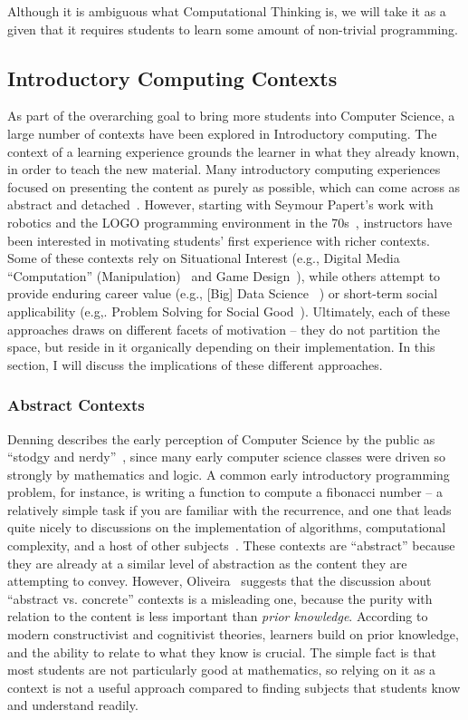 Although it is ambiguous what Computational Thinking is, we will take it as a given that it requires students to learn some amount of non-trivial programming.

\subsection{Introductory Computing Contexts}

As part of the overarching goal to bring more students into Computer Science, a large number of contexts have been explored in Introductory computing. 
The context of a learning experience grounds the learner in what they already known, in order to teach the new material.
Many introductory computing experiences focused on presenting the content as purely as possible, which can come across as abstract and detached~\cite{Zografski}.
However, starting with Seymour Papert's work with robotics and the LOGO programming environment in the 70s~\cite{papert1996}, instructors have been interested in motivating students' first experience with richer contexts.
Some of these contexts rely on Situational Interest (e.g.,  Digital Media ``Computation'' (Manipulation)~\cite{Forte} and Game Design~\cite{Zografski}), while others attempt to provide enduring career value (e.g., [Big] Data Science ~\cite{Anderson}) or short-term social applicability (e.g,. Problem Solving for Social Good~\cite{SocialGoodinComputingEducation}).
Ultimately, each of these approaches draws on different facets of motivation -- they do not partition the space, but reside in it organically depending on their implementation.
In this section, I will discuss the implications of these different approaches.


\subsubsection{Abstract Contexts}

Denning describes the early perception of Computer Science by the public as ``stodgy and nerdy''~\cite{Denning:2005}, since many early computer science classes were driven so strongly by mathematics and logic.
A common early introductory programming problem, for instance, is writing a function to compute a fibonacci number -- a relatively simple task if you are familiar with the recurrence, and one that leads quite nicely to discussions on the implementation of algorithms, computational complexity, and a host of other subjects~\cite{crazypantsfibonaccipaper}.
These contexts are ``abstract'' because they are already at a similar level of abstraction as the content they are attempting to convey.
However, Oliveira~\cite{ConcreteVsAbstract} suggests that the discussion about ``abstract vs. concrete'' contexts is a misleading one, because the purity with relation to the content is less important than \textit{prior knowledge}.
According to modern constructivist and cognitivist theories, learners build on prior knowledge, and the ability to relate to what they know is crucial.
The simple fact is that most students are not particularly good at mathematics, so relying on it as a context is not a useful approach compared to finding subjects that students know and understand readily.


